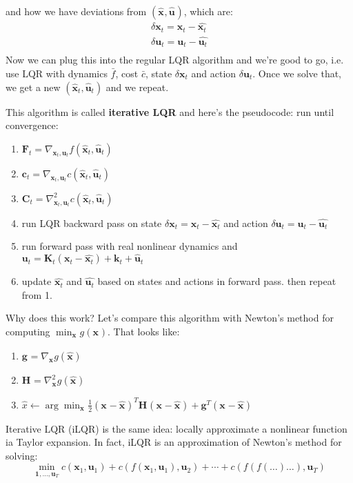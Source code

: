 \documentclass{report}
\newcommand{\argmin}{\arg\!\min}
\begin{document}
and how we have deviations from $ (\hat{\bm{x}}_{}, \hat{\bm{u}}_{} )  $,
which are:
\begin{align}
\delta \bm{x}_{t} = \bm{x}_{t} - \hat{\bm{x}_{t}} \\
\delta \bm{u}_{t} = \bm{u}_{t} - \hat{\bm{u}_{t}} \\
\end{align}
Now we can plug this into the regular LQR algorithm and we're good to go,
i.e. use LQR with dynamics $ \bar{f}  $, cost $ \bar{c}  $,
state $ \delta\bm{x}_{t}   $ and action $ \delta \bm{u}_{t}  $.
Once we solve that, we get a new $ (\hat{\bm{x}}_{t}, \hat{\bm{u}}_{t} )  $
and we repeat.

This algorithm is called \textbf{iterative LQR} and here's the pseudocode:
run until convergence:
\begin{enumerate}
\item $ \bm{F}_{t} = \nabla_{ \bm{x}_{t}, \bm{u}_{t} } f (\hat{\bm{x}}_{t}, \hat{\bm{u}}_{t} )  $
\item $ \bm{c}_{t} = \nabla_{ \bm{x}_{t}, \bm{u}_{t} } c (\hat{\bm{x}}_{t}, \hat{\bm{u}}_{t} )  $
\item $ \bm{C}_{t} = \nabla_{ \bm{x}_{t}, \bm{u}_{t} }^{ 2 } c (\hat{\bm{x}}_{t}, \hat{\bm{u}}_{t} )  $
\item run LQR backward pass on state $ \delta\bm{x}_{t} = \bm{x}_{t} - \hat{\bm{x}_{t}}  $
		and action $ \delta \bm{u}_{t} = \bm{u}_{t} - \hat{\bm{u}_{t}}  $
\item run forward pass with real nonlinear dynamics and $ \bm{u}_{t} =
		\bm{K}_{t} (\bm{x}_{t} - \hat{\bm{x}_{t}}) + \bm{k}_{t} + \hat{\bm{u}}_{t}$
\item update $ \hat{\bm{x}_{t}}  $ and $ \hat{\bm{u}_{t}}  $ based on states
		and actions in forward pass. then repeat from 1.
\end{enumerate}
Why does this work?
Let's compare this algorithm with Newton's method for
computing $ \min_{\bm{x}_{}} g(\bm{x}_{})  $.
That looks like:
\begin{enumerate}
		\item $ \bm{g}_{} = \nabla_{ \bm{x}_{} } g (\hat{\bm{x}_{}})  $
		\item $\bm{H}_{} = \nabla_{ \bm{x}_{} }^{ 2 } g (\hat{\bm{x}_{}})   $
		\item $ \hat{x} \leftarrow \argmin_{\bm{x}_{}} \frac{1}{2} 
				(\bm{x}_{} - \hat{\bm{x}_{}})^{ T } \bm{H}_{} (\bm{x}_{} -\hat{\bm{x}_{}})
				+ \bm{g}_{}^{ T } (\bm{x}_{} -\hat{\bm{x}_{}})$
\end{enumerate}
Iterative LQR (iLQR) is the same idea:
locally approximate a nonlinear function ia Taylor expansion.
In fact, iLQR is an approximation of Newton's method for solving:
\begin{equation}
\min_{\bm{1}_{}, \dots, \bm{u}_{T}} c (\bm{x}_{1}, \bm{u}_{1} )
+ c (f (\bm{x}_{1}, \bm{u}_{1} ), \bm{u}_{2}) + \cdots + c
(f (f (\dots) \dots), \bm{u}_{T})
\end{equation}
\end{document}
